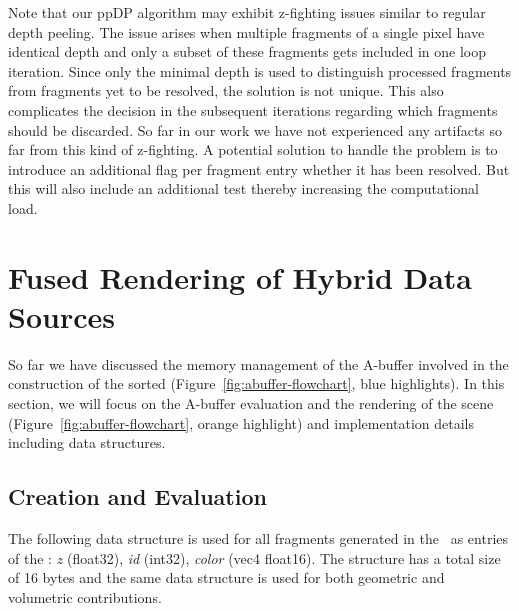 \documentclass{egpubl}
\newcommand{\ab}{\mbox{A-buffer}}
\newcommand{\dloop}{ppDP}
\begin{document}
Note that our \dloop{} algorithm may exhibit z-fighting issues similar to regular depth peeling. 
The issue arises when multiple fragments of a single pixel have identical depth and only a subset of these fragments gets included in one loop iteration. 
Since only the minimal depth is used to distinguish processed fragments from fragments yet to be resolved, the solution is not unique.
This also complicates the decision in the subsequent iterations regarding which fragments should be discarded.
So far in our work we have not experienced any artifacts so far from this kind of z-fighting. 
A potential solution to handle the problem is to introduce an additional flag per fragment entry whether it has been resolved.
But this will also include an additional test thereby increasing the computational load.


\section{Fused Rendering of Hybrid Data Sources}
\label{sec:fusion}

So far we have discussed the memory management of the \ab{} involved in the construction of the sorted \bFraglist{} (Figure~\ref{fig:abuffer-flowchart}, blue highlights). 
In this section, we will focus on the \ab{} evaluation and the rendering of the scene (Figure~\ref{fig:abuffer-flowchart}, orange highlight) and implementation details including data structures.

\newcommand{\ccz}{\emph{z}}
\newcommand{\ccid}{\emph{id}}
\newcommand{\cccol}{\emph{color}}

\subsection{\bFraglist{} Creation and Evaluation}

The following data structure is used for all fragments generated in the \sFill\ as entries of the \bFraglist: 
\ccz{} (float32), \ccid{} (int32), \cccol{} (vec4 float16).
The structure has a total size of 16 bytes and the same data structure is used for both geometric and volumetric contributions. 
\end{document}
